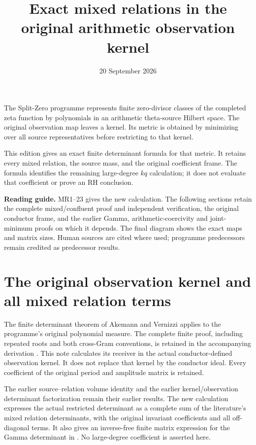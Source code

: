 \documentclass[11pt]{article}
\begin{document}
\title{Exact mixed relations in the original arithmetic observation kernel}
\author{}\date{20 September 2026}\maketitle

The Split-Zero programme represents finite zero-divisor classes of the
completed zeta function by polynomials in an arithmetic theta-source
Hilbert space. The original observation map leaves a kernel. Its metric
is obtained by minimizing over all source representatives before
restricting to that kernel.

This edition gives an exact finite determinant formula for that metric.
It retains every mixed relation, the source mass, and the original
coefficient frame. The formula identifies the remaining large-degree
$kq$ calculation; it does not evaluate that coefficient or prove an RH
conclusion.

\medskip\noindent\textbf{Reading guide.}
MR1--23 gives the new calculation. The following sections retain the
complete mixed/confluent proof and independent verification, the original
conductor frame, and the earlier Gamma, arithmetic-coercivity and
joint-minimum proofs on which it depends. The final diagram shows the
exact maps and matrix sizes. Human sources are cited where used;
programme predecessors remain credited as predecessor results.


\clearpage\begingroup
\part*{The original observation kernel and all mixed relation terms}
\newcommand{\mrrootC}{\mathbb C}
\newcommand{\mrrootR}{\mathbb R}


The finite determinant theorem of Akemann and Vernizzi
\cite[\texttt{Th}, \texttt{Ddef}, \texttt{deg}]{mrroot:AV} applies to the
programme's original polynomial measure. The complete finite proof,
including repeated roots and both cross-Gram conventions, is retained
in the accompanying derivation \cite{mrroot:Mixed}. This note calculates its
receiver in the actual conductor-defined observation kernel. It does
not replace that kernel by the conductor ideal. Every coefficient of
the original period and amplitude matrix is retained.

The earlier source--relation volume identity \cite[(11)--(16)]{mrroot:Toda}
and the earlier kernel/observation determinant factorization
\cite[FW37--40]{mrroot:FW} remain their earlier results. The new calculation
expresses the actual restricted determinant as a complete sum of the
literature's mixed relation determinants, with the original invariant
coefficients and all off-diagonal terms. It also gives an inverse-free
finite matrix expression for the Gamma determinant in
\cite[JM21--28]{mrroot:JM}. No large-degree coefficient is asserted here.
\end{document}
